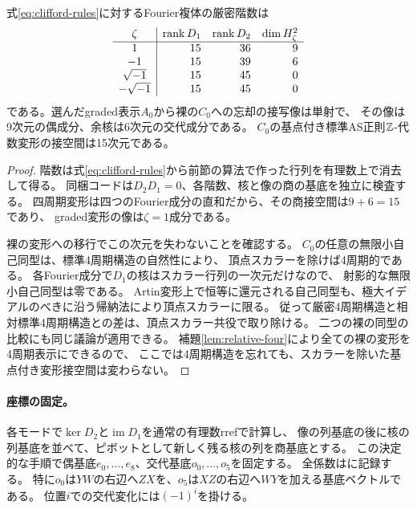\begin{theorem}[Clifford点の変形接空間]\label{thm:clifford-tangent}
式\eqref{eq:clifford-rules}に対するFourier複体の厳密階数は
\begin{equation}\label{eq:clifford-ranks}
\begin{array}{c|rrr}
\zeta&\operatorname{rank} D_1&\operatorname{rank} D_2&\dim H^2_\zeta\\\hline
1&15&36&9\\
-1&15&39&6\\
\sqrt{-1}&15&45&0\\
-\sqrt{-1}&15&45&0
\end{array}
\end{equation}
である。選んだgraded表示$A_0$から裸の$C_0$への忘却の接写像は単射で、
その像は9次元の偶成分、余核は6次元の交代成分である。
$C_0$の基点付き標準AS正則$\mathbb Z$-代数変形の接空間は15次元である。
\end{theorem}
\begin{proof}
階数は式\eqref{eq:clifford-rules}から前節の算法で作った行列を有理数上で消去して得る。
同梱コードは$D_2D_1=0$、各階数、核と像の商の基底を独立に検査する。
四周期変形は四つのFourier成分の直和だから、その商接空間は$9+6=15$であり、
graded変形の像は$\zeta=1$成分である。

裸の変形への移行でこの次元を失わないことを確認する。
$C_0$の任意の無限小自己同型は、標準4周期構造の自然性により、
頂点スカラーを除けば4周期的である。
各Fourier成分で$D_1$の核はスカラー行列の一次元だけなので、
射影的な無限小自己同型は零である。
Artin変形上で恒等に還元される自己同型も、極大イデアルのべきに沿う帰納法により頂点スカラーに限る。
従って厳密4周期構造と相対標準4周期構造との差は、頂点スカラー共役で取り除ける。
二つの裸の同型の比較にも同じ議論が適用できる。
補題\ref{lem:relative-four}により全ての裸の変形を4周期表示にできるので、
ここでは4周期構造を忘れても、スカラーを除いた基点付き変形接空間は変わらない。
\end{proof}

\paragraph{座標の固定。}
各モードで$\ker D_2$と$\operatorname{im}D_1$を通常の有理数rrefで計算し、
像の列基底の後に核の列基底を並べて、ピボットとして新しく残る核の列を商基底とする。
この決定的な手順で偶基底$e_0,\ldots,e_8$、交代基底$o_0,\ldots,o_5$を固定する。
全係数はに記録する。
特に$o_0$は$YW$の右辺へ$ZX$を、$o_5$は$XZ$の右辺へ$WY$を加える基底ベクトルである。
位置$i$での交代変化には$(-1)^i$を掛ける。


